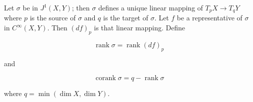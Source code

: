 Let $\sigma$ be in $J^1(X, Y)$; then $\sigma$ defines a unique linear mapping of $T_p X \to T_q Y$ where $p$ is the source of $\sigma$ and $q$ is the target of $\sigma$. Let $f$ be a representative of $\sigma$ in $C^\infty(X, Y)$. Then $(df)_p$ is that linear mapping. Define

$$\operatorname{rank} \sigma = \operatorname{rank}(df)_p$$

and

$$\operatorname{corank} \sigma = q - \operatorname{rank} \sigma$$

where $q = \min(\dim X, \dim Y)$.
